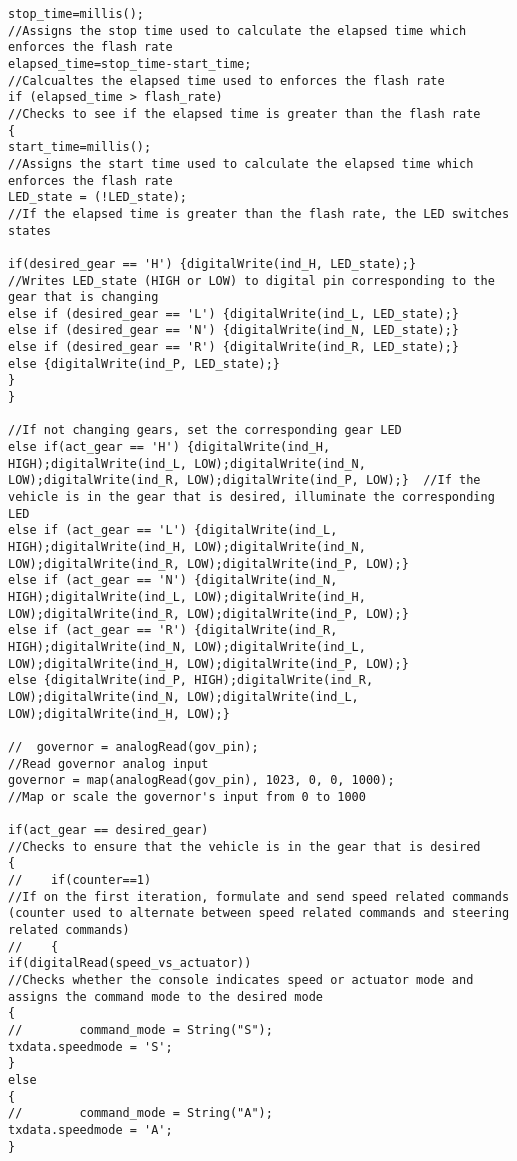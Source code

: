 \begin{lstlisting}[breaklines=true,basicstyle=\tiny]
stop_time=millis();                                                               //Assigns the stop time used to calculate the elapsed time which enforces the flash rate
elapsed_time=stop_time-start_time;                                                //Calcualtes the elapsed time used to enforces the flash rate
if (elapsed_time > flash_rate)                                                    //Checks to see if the elapsed time is greater than the flash rate
{
start_time=millis();                                                            //Assigns the start time used to calculate the elapsed time which enforces the flash rate
LED_state = (!LED_state);                                                       //If the elapsed time is greater than the flash rate, the LED switches states

if(desired_gear == 'H') {digitalWrite(ind_H, LED_state);}                       //Writes LED_state (HIGH or LOW) to digital pin corresponding to the gear that is changing
else if (desired_gear == 'L') {digitalWrite(ind_L, LED_state);}
else if (desired_gear == 'N') {digitalWrite(ind_N, LED_state);}
else if (desired_gear == 'R') {digitalWrite(ind_R, LED_state);}
else {digitalWrite(ind_P, LED_state);}
}
}

//If not changing gears, set the corresponding gear LED
else if(act_gear == 'H') {digitalWrite(ind_H, HIGH);digitalWrite(ind_L, LOW);digitalWrite(ind_N, LOW);digitalWrite(ind_R, LOW);digitalWrite(ind_P, LOW);}  //If the vehicle is in the gear that is desired, illuminate the corresponding LED
else if (act_gear == 'L') {digitalWrite(ind_L, HIGH);digitalWrite(ind_H, LOW);digitalWrite(ind_N, LOW);digitalWrite(ind_R, LOW);digitalWrite(ind_P, LOW);}
else if (act_gear == 'N') {digitalWrite(ind_N, HIGH);digitalWrite(ind_L, LOW);digitalWrite(ind_H, LOW);digitalWrite(ind_R, LOW);digitalWrite(ind_P, LOW);}
else if (act_gear == 'R') {digitalWrite(ind_R, HIGH);digitalWrite(ind_N, LOW);digitalWrite(ind_L, LOW);digitalWrite(ind_H, LOW);digitalWrite(ind_P, LOW);}
else {digitalWrite(ind_P, HIGH);digitalWrite(ind_R, LOW);digitalWrite(ind_N, LOW);digitalWrite(ind_L, LOW);digitalWrite(ind_H, LOW);} 

//  governor = analogRead(gov_pin);                                                      //Read governor analog input
governor = map(analogRead(gov_pin), 1023, 0, 0, 1000);                               //Map or scale the governor's input from 0 to 1000

if(act_gear == desired_gear)                                                         //Checks to ensure that the vehicle is in the gear that is desired
{
//    if(counter==1)                                                                    //If on the first iteration, formulate and send speed related commands (counter used to alternate between speed related commands and steering related commands)
//    {  
if(digitalRead(speed_vs_actuator))                                         //Checks whether the console indicates speed or actuator mode and assigns the command mode to the desired mode
{
//        command_mode = String("S");
txdata.speedmode = 'S';
}
else
{
//        command_mode = String("A");
txdata.speedmode = 'A';
}



\end{lstlisting}
